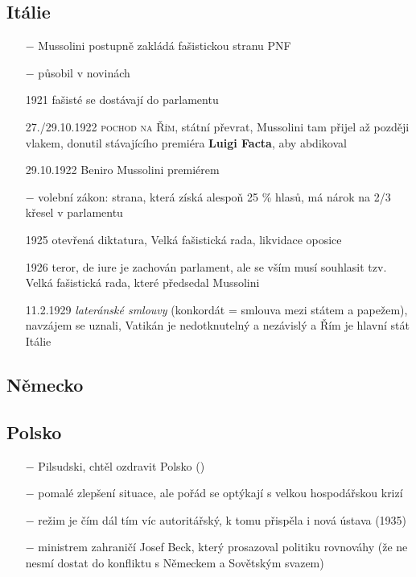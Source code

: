 \documentclass{article}
\begin{document}
\subsection*{Itálie}
\begin{itemize}
    \vspace{-0.5em}
    \setlength\itemsep{0.15em}
    \item[$-$] Mussolini postupně zakládá fašistickou stranu PNF
    \item[$-$] působil v novinách
    \item[1921] fašisté se dostávají do parlamentu
    \item[27./29.10.1922] \textsc{pochod na Řím}, státní převrat, Mussolini tam přijel až později vlakem, donutil stávajícího premiéra \textbf{Luigi Facta}, aby abdikoval
    \item[29.10.1922] Beniro Mussolini premiérem
    \item[$-$] volební zákon: strana, která získá alespoň 25 \% hlasů, má nárok na 2/3 křesel v parlamentu
    \item[1925] otevřená diktatura, Velká fašistická rada, likvidace oposice
    \item[1926] teror, de iure je zachován parlament, ale se vším musí souhlasit tzv. Velká fašistická rada, které předsedal Mussolini
    \item[11.2.1929] \textit{lateránské smlouvy} (konkordát = smlouva mezi státem a papežem), navzájem se uznali, Vatikán je nedotknutelný a nezávislý a Řím je hlavní stát Itálie
\end{itemize}

\subsection*{Německo}

\subsection*{Polsko}
\begin{itemize}
    \vspace{-0.5em}
    \setlength\itemsep{0.15em}
    \item[$-$] Pilsudski, chtěl ozdravit Polsko ()
    \item[$-$] pomalé zlepšení situace, ale pořád se optýkají s velkou hospodářskou krizí
    \item[$-$] režim je čím dál tím víc autoritářský, k tomu přispěla i nová ústava (1935)
    \item[$-$] ministrem zahraničí Josef Beck, který prosazoval politiku rovnováhy (že ne nesmí dostat do konfliktu s Německem a Sovětským svazem)
\end{itemize}
\end{document}
